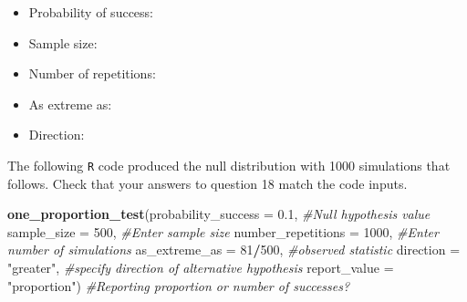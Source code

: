 \documentclass[
]{report}
\newenvironment{Shaded}{\begin{snugshade}}{\end{snugshade}}
\newcommand{\CommentTok}[1]{\textcolor[rgb]{0.56,0.35,0.01}{\textit{#1}}}
\newcommand{\DataTypeTok}[1]{\textcolor[rgb]{0.13,0.29,0.53}{#1}}
\newcommand{\DecValTok}[1]{\textcolor[rgb]{0.00,0.00,0.81}{#1}}
\newcommand{\FloatTok}[1]{\textcolor[rgb]{0.00,0.00,0.81}{#1}}
\newcommand{\KeywordTok}[1]{\textcolor[rgb]{0.13,0.29,0.53}{\textbf{#1}}}
\newcommand{\NormalTok}[1]{#1}
\newcommand{\OperatorTok}[1]{\textcolor[rgb]{0.81,0.36,0.00}{\textbf{#1}}}
\newcommand{\StringTok}[1]{\textcolor[rgb]{0.31,0.60,0.02}{#1}}
\providecommand{\tightlist}{%
  \setlength{\itemsep}{0pt}\setlength{\parskip}{0pt}}
\begin{document}
\vspace{.2in}

\begin{itemize}
\tightlist
\item
  Probability of success:
\end{itemize}

\vspace{.2in}

\begin{itemize}
\tightlist
\item
  Sample size:
\end{itemize}

\vspace{.2in}

\begin{itemize}
\tightlist
\item
  Number of repetitions:
\end{itemize}

\vspace{.2in}

\begin{itemize}
\tightlist
\item
  As extreme as:
\end{itemize}

\vspace{.2in}

\begin{itemize}
\tightlist
\item
  Direction:
\end{itemize}

\newpage

The following \texttt{R} code produced the null distribution with 1000 simulations that follows. Check that your answers to question 18 match the code inputs.

\begin{Shaded}
\begin{Highlighting}[]
\KeywordTok{one_proportion_test}\NormalTok{(}\DataTypeTok{probability_success =} \FloatTok{0.1}\NormalTok{, }\CommentTok{#Null hypothesis value}
                    \DataTypeTok{sample_size =} \DecValTok{500}\NormalTok{, }\CommentTok{#Enter sample size}
                    \DataTypeTok{number_repetitions =} \DecValTok{1000}\NormalTok{, }\CommentTok{#Enter number of simulations}
                    \DataTypeTok{as_extreme_as =} \DecValTok{81}\OperatorTok{/}\DecValTok{500}\NormalTok{, }\CommentTok{#observed statistic}
                    \DataTypeTok{direction =} \StringTok{"greater"}\NormalTok{, }\CommentTok{#specify direction of alternative hypothesis}
                    \DataTypeTok{report_value =} \StringTok{"proportion"}\NormalTok{) }\CommentTok{#Reporting proportion or number of successes?}
\end{Highlighting}
\end{Shaded}
\end{document}
